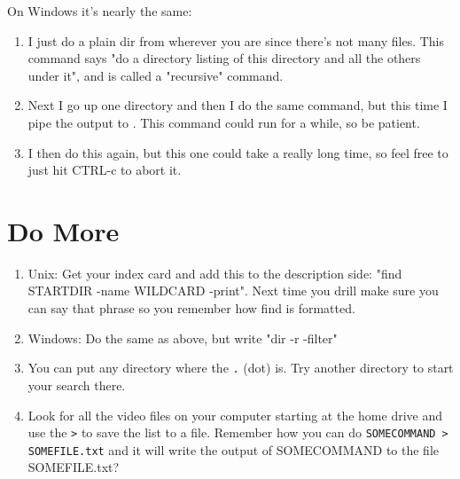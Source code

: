 On Windows it's nearly the same:

\begin{enumerate}
\item I just do a plain dir from wherever you are since there's not many  files. This command says "do a directory listing of this directory and all the others under it", and is called a "recursive" command.
\item Next I go up one directory and then I do the same command, but this time I pipe the output to .  This command could run for a while, so be patient.
\item I then do this again, but this one could take a really long time, so feel free to just hit CTRL-c to abort it.
\end{enumerate}

\section{Do More}

\begin{enumerate}
\item Unix: Get your  index card and add this to the description side: "find STARTDIR -name WILDCARD -print".  Next time you drill make sure you can say that phrase so you remember how find is formatted.
\item Windows: Do the same as above, but write "dir -r -filter"
\item You can put any directory where the \verb|.| (dot) is.  Try another directory to start your search there.
\item Look for all the video files on your computer starting at the home drive and use the \verb|>| to save the list to a file.  Remember how you can do \verb|SOMECOMMAND > SOMEFILE.txt| and it will write the output of SOMECOMMAND to the file SOMEFILE.txt?
\end{enumerate}

